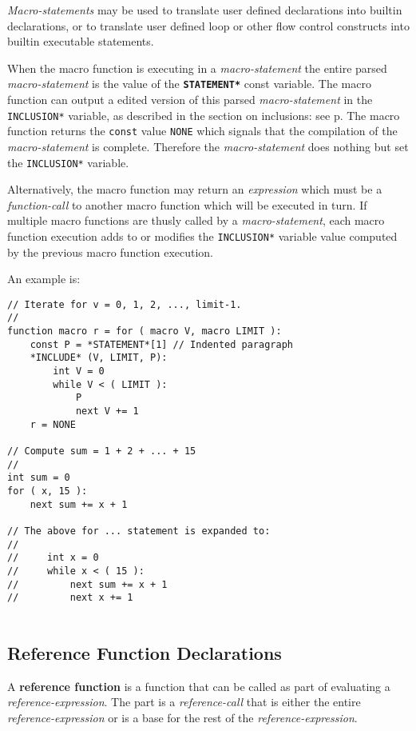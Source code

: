 \documentclass[12pt]{article}
\newcommand{\key}[1]{{\rm \bfseries #1}}
\newcommand{\ttkey}[1]{{\tt \bfseries #1}}
\newcommand{\pagref}[1]{p\pageref{#1}}
\newenvironment{indpar}[1][0.3in]%
	{\begin{list}{}%
		     {\setlength{\itemsep}{0in}%
		      \setlength{\topsep}{0in}%
		      \setlength{\parsep}{1ex}%
		      \setlength{\labelwidth}{#1}%
		      \setlength{\leftmargin}{#1}%
		      \addtolength{\leftmargin}{\labelsep}}%
	 \item}%
	{\end{list}}
\begin{document}
{\em Macro-statements} may be used to translate user defined declarations
into builtin declarations, or to translate user defined loop or
other flow control constructs into builtin executable statements.

When the macro function is executing in a {\em macro-statement}
the entire parsed {\em macro-state\-ment} is the value of the
\ttkey{*STATEMENT*} const variable.  The macro function can
output a edited version of this parsed {\em macro-statement}
in the {\tt *INCLUSION*} variable, as described in
the section on inclusions: see \pagref{INCLUSIONS}.
The macro function returns the {\tt const} value {\tt NONE}
which signals that the compilation of the {\em macro-statement}
is complete.  Therefore the {\em macro-statement} does nothing
but set the {\tt *INCLUSION*} variable.

Alternatively,
the macro function may return an {\em expression}
which must be a {\em function-call} to another macro function which
will be executed in turn.
If multiple macro functions are thusly called by a {\em macro-statement},
each macro function execution adds to or modifies
the {\tt *INCLUSION*} variable
value computed  by the previous macro function execution.

An example is:
\begin{indpar}[1em]\begin{verbatim}
// Iterate for v = 0, 1, 2, ..., limit-1.
//
function macro r = for ( macro V, macro LIMIT ):
    const P = *STATEMENT*[1] // Indented paragraph
    *INCLUDE* (V, LIMIT, P):
        int V = 0
        while V < ( LIMIT ):
            P
            next V += 1
    r = NONE

// Compute sum = 1 + 2 + ... + 15
//
int sum = 0
for ( x, 15 ):
    next sum += x + 1

// The above for ... statement is expanded to:
//
//     int x = 0
//     while x < ( 15 ):
//         next sum += x + 1
//         next x += 1
    
\end{verbatim}\end{indpar}


\subsection{Reference Function Declarations}
\label{REFERENCE-FUNCTION-DECLARATIONS}

A \key{reference function} is a function that can be
called as part of evaluating a {\em reference-expression}.
The part is a {\em reference-call} that is either the entire
{\em reference-expression} or is a base for the rest of
the {\em reference-expression}.
\end{document}
